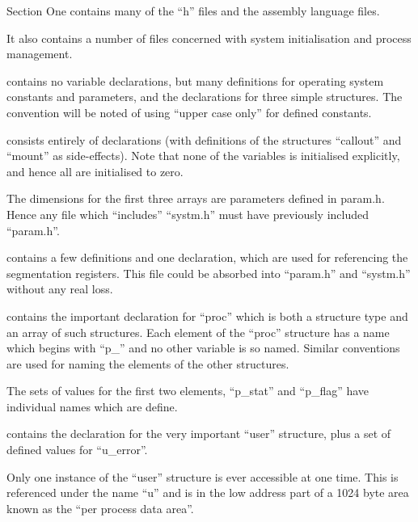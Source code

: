 
Section One contains many of the ``h''
files and the assembly language files.

It also contains a number of files concerned 
with system initialisation and
process management.


\bd
\item[param.h] [Sheet 01] contains no variable 
declarations, but many definitions 
for operating system constants
and parameters, and the declarations
for three simple structures. The
convention will be noted of using
``upper case only'' for defined constants.


\item[systm.h] [Sheet 02; Chapter 19] consists 
entirely of declarations (with
definitions of the structures ``callout''
and ``mount'' as side-effects).
Note that none of the variables is
initialised explicitly, and hence
all are initialised to zero.

The dimensions for the first three
arrays are parameters defined in
param.h. Hence any file which
``includes'' ``systm.h'' must have
previously included ``param.h''.

\item[seg.h] [Sheet 03] contains a few
definitions and one declaration,
which are used for referencing the
segmentation registers. This file
could be absorbed into ``param.h'' and
``systm.h'' without any real loss.

\item[proc.h] [Sheet 03; Chapter 7] contains 
the important declaration for
``proc'' which is both a structure
type and an array of such structures.
Each element of the ``proc''
structure has a name which begins
with ``p\_'' and no other variable is
so named. Similar conventions are
used for naming the elements of the
other structures.

The sets of values for the first two
elements, ``p\_stat'' and ``p\_flag''
have individual names which are
define.


\item[user.h] [Sheet 04; Chapter 7] contains 
the declaration for the very
important ``user'' structure, plus a
set of defined values for ``u\_error''.

Only one instance of the ``user''
structure is ever accessible at one
time. This is referenced under the
name ``u'' and is in the low address
part of a 1024 byte area known as
the ``per process data area''.

